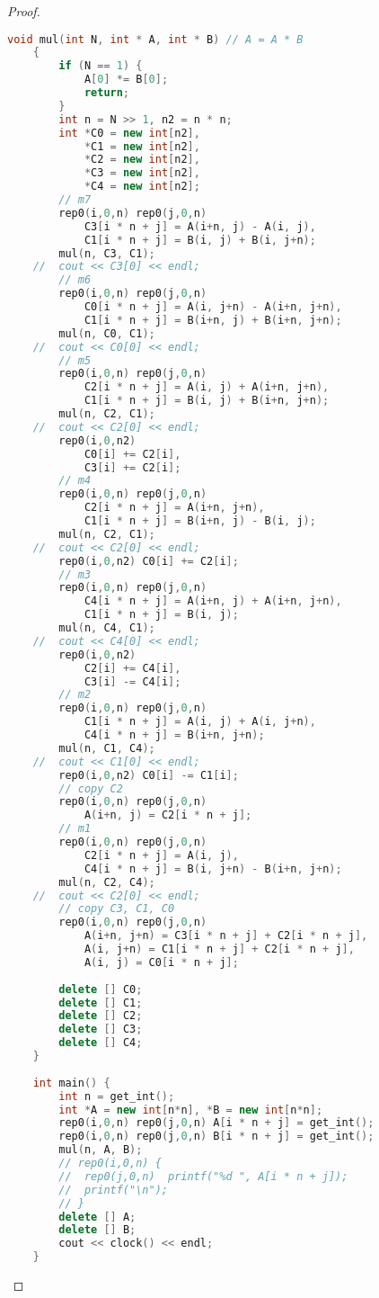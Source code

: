 \documentclass[letterpaper,11pt\iffalse ,draft\fi]{article}
\begin{document}
\begin{proof}
\begin{lstlisting}[language=C++]
    void mul(int N, int * A, int * B) // A = A * B
    {
        if (N == 1) {
            A[0] *= B[0];
            return;
        }
        int n = N >> 1, n2 = n * n;
        int *C0 = new int[n2],
            *C1 = new int[n2],
            *C2 = new int[n2],
            *C3 = new int[n2],
            *C4 = new int[n2];
        // m7
        rep0(i,0,n) rep0(j,0,n)
            C3[i * n + j] = A(i+n, j) - A(i, j),
            C1[i * n + j] = B(i, j) + B(i, j+n);
        mul(n, C3, C1);
    //  cout << C3[0] << endl;
        // m6
        rep0(i,0,n) rep0(j,0,n)
            C0[i * n + j] = A(i, j+n) - A(i+n, j+n),
            C1[i * n + j] = B(i+n, j) + B(i+n, j+n);
        mul(n, C0, C1);
    //  cout << C0[0] << endl;
        // m5
        rep0(i,0,n) rep0(j,0,n)
            C2[i * n + j] = A(i, j) + A(i+n, j+n),
            C1[i * n + j] = B(i, j) + B(i+n, j+n);
        mul(n, C2, C1);
    //  cout << C2[0] << endl;
        rep0(i,0,n2)
            C0[i] += C2[i],
            C3[i] += C2[i];
        // m4
        rep0(i,0,n) rep0(j,0,n)
            C2[i * n + j] = A(i+n, j+n),
            C1[i * n + j] = B(i+n, j) - B(i, j);
        mul(n, C2, C1);
    //  cout << C2[0] << endl;
        rep0(i,0,n2) C0[i] += C2[i];
        // m3
        rep0(i,0,n) rep0(j,0,n)
            C4[i * n + j] = A(i+n, j) + A(i+n, j+n),
            C1[i * n + j] = B(i, j);
        mul(n, C4, C1);
    //  cout << C4[0] << endl;
        rep0(i,0,n2)
            C2[i] += C4[i],
            C3[i] -= C4[i];
        // m2
        rep0(i,0,n) rep0(j,0,n)
            C1[i * n + j] = A(i, j) + A(i, j+n),
            C4[i * n + j] = B(i+n, j+n);
        mul(n, C1, C4);
    //  cout << C1[0] << endl;
        rep0(i,0,n2) C0[i] -= C1[i];
        // copy C2
        rep0(i,0,n) rep0(j,0,n)
            A(i+n, j) = C2[i * n + j];
        // m1
        rep0(i,0,n) rep0(j,0,n)
            C2[i * n + j] = A(i, j),
            C4[i * n + j] = B(i, j+n) - B(i+n, j+n);
        mul(n, C2, C4);
    //  cout << C2[0] << endl;
        // copy C3, C1, C0
        rep0(i,0,n) rep0(j,0,n)
            A(i+n, j+n) = C3[i * n + j] + C2[i * n + j],
            A(i, j+n) = C1[i * n + j] + C2[i * n + j],
            A(i, j) = C0[i * n + j];
        
        delete [] C0;
        delete [] C1;
        delete [] C2;
        delete [] C3;
        delete [] C4;
    }
    
    int main() {
        int n = get_int();
        int *A = new int[n*n], *B = new int[n*n];
        rep0(i,0,n) rep0(j,0,n) A[i * n + j] = get_int();
        rep0(i,0,n) rep0(j,0,n) B[i * n + j] = get_int();
        mul(n, A, B);
        // rep0(i,0,n) {
        //  rep0(j,0,n)  printf("%d ", A[i * n + j]);
        //  printf("\n");
        // }
        delete [] A;
        delete [] B;
        cout << clock() << endl;
    }
\end{lstlisting}

\end{proof}
\end{document}
